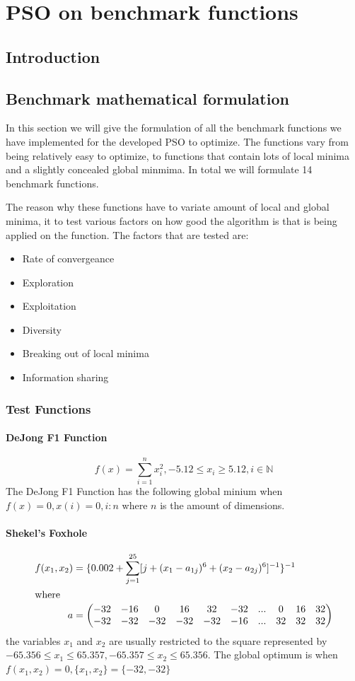 \chapter{PSO on benchmark functions}
\section{Introduction}
\section{Benchmark mathematical formulation}
In this section we will give the formulation of all the benchmark functions we have implemented for the developed PSO to optimize. The functions vary from being relatively easy to optimize, to functions that contain lots of local minima and a slightly concealed global minmima. In total we will formulate 14 benchmark functions.

The reason why these functions have to variate amount of local and global minima, it to test various factors on how good the algorithm is that is being applied on the function. The factors that are tested are:
\begin{itemize}
\item Rate of convergeance
\item Exploration
\item Exploitation
\item Diversity
\item Breaking out of local minima
\item Information sharing
\end{itemize}
\subsection{Test Functions}
\subsubsection{DeJong F1 Function}
\begin{equation}
\label{eq:DeJongF1}
	f(x) = \sum_{i=1}^n x^2_i, -5.12 \leq x_i \geq 5.12, i \in \mathbb{N}
\end{equation}
The DeJong F1 Function has the following global minium when $f(x) = 0, x(i) = 0, i:n$ where $n$ is the amount of dimensions. 
\subsubsection{Shekel's Foxhole}
\begin{align}
	f(x_1,x_2) &= \{0.002 + \sum^{25}_{j=1} [j + (x_1 - a_{1j})^6 + (x_2 - a_{2j})^6]^{-1}\}^{-1}\\
\intertext{where}
	a &= \begin{pmatrix} \nonumber
			-32 & -16 & 0 & 16 & 32 & -32 & ... & 0 & 16 & 32 \\
			-32 & -32 & -32 & -32 & -32 & -16 & ... & 32 & 32 & 32 \\
		 \end{pmatrix}
\end{align}
the variables $x_1$ and $x_2$ are usually restricted to the square represented by $-65.356 \leq x_1 \leq 65.357, -65.357 \leq x_2 \leq 65.356$. The global optimum is when $f(x_1,x_2) = 0, \{x_1,x_2\} = \{-32,-32\}$
